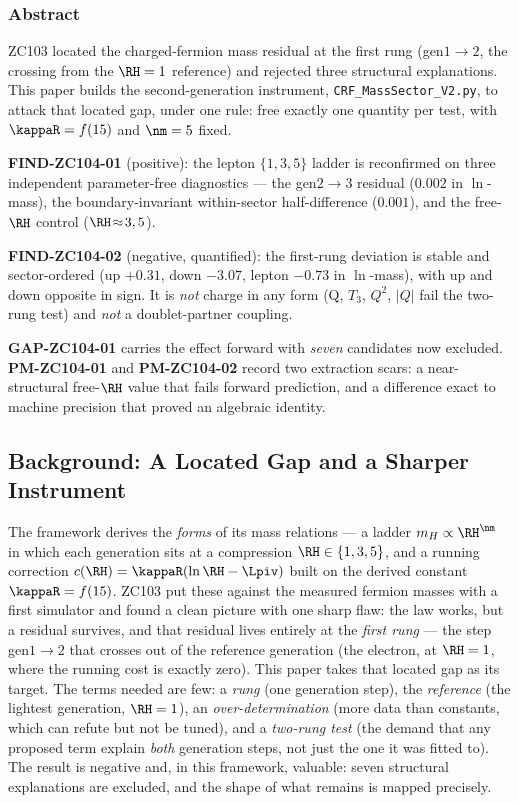 \documentclass[12pt, a4paper]{article}
\begin{document}
\subsubsection*{Abstract}
\sloppy
ZC103 located the charged-fermion mass residual at the first rung
(gen$1{\to}2$, the crossing from the $\RH=1$ reference) and rejected three
structural explanations. This paper builds the second-generation instrument,
\texttt{CRF\_MassSector\_V2.py}, to attack that located gap, under one rule:
free exactly one quantity per test, with $\kappaR=f(15)$ and $\nm=5$ fixed.

\textbf{FIND-ZC104-01} (positive): the lepton $\{1,3,5\}$ ladder is reconfirmed
on three independent parameter-free diagnostics --- the gen$2{\to}3$ residual
($0.002$ in $\ln$-mass), the boundary-invariant within-sector half-difference
($0.001$), and the free-$\RH$ control ($\RH\!\approx\!3,5$).

\textbf{FIND-ZC104-02} (negative, quantified): the first-rung deviation is stable
and sector-ordered (up $+0.31$, down $-3.07$, lepton $-0.73$ in $\ln$-mass), with
up and down opposite in sign. It is \emph{not} charge in any form (Q, $T_3$,
$Q^2$, $|Q|$ fail the two-rung test) and \emph{not} a doublet-partner coupling.

\textbf{GAP-ZC104-01} carries the effect forward with \emph{seven} candidates now
excluded. \textbf{PM-ZC104-01} and \textbf{PM-ZC104-02} record two extraction
scars: a near-structural free-$\RH$ value that fails forward prediction, and a
difference exact to machine precision that proved an algebraic identity.


\subsection{Background: A Located Gap and a Sharper Instrument}
\label{sec:background-zc104}

The framework derives the \emph{forms} of its mass relations --- a ladder
$m_H\propto\RH^{\nm}$ in which each generation sits at a compression
$\RH\in\{1,3,5\}$, and a running correction $c(\RH)=\kappaR(\ln\RH-\Lpiv)$ built
on the derived constant $\kappaR=f(15)$. ZC103 put these against the measured
fermion masses with a first simulator and found a clean picture with one sharp
flaw: the law works, but a residual survives, and that residual lives entirely at
the \emph{first rung} --- the step gen$1{\to}2$ that crosses out of the reference
generation (the electron, at $\RH=1$, where the running cost is exactly zero).
This paper takes that located gap as its target. The terms needed are few: a
\emph{rung} (one generation step), the \emph{reference} (the lightest generation,
$\RH=1$), an \emph{over-determination} (more data than constants, which can
refute but not be tuned), and a \emph{two-rung test} (the demand that any
proposed term explain \emph{both} generation steps, not just the one it was fitted
to). The result is negative and, in this framework, valuable: seven structural
explanations are excluded, and the shape of what remains is mapped precisely.
\end{document}
